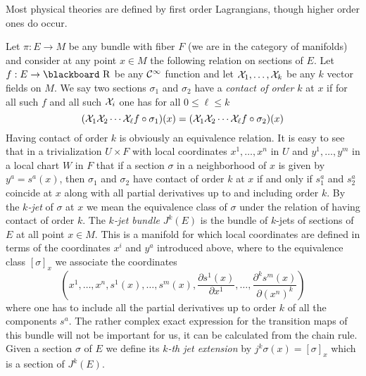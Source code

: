 \documentclass[12pt,titlepage]{article}
\def\bbf#1{\hbox{\blackboard #1}}
\def\lR{\bbf R}
\def\cC{{\cal C}}
\def\cX{{\cal X}}
\begin{document}
 Most physical theories are defined by first order Lagrangians, though
higher order ones do occur.

Let \(\pi:E\to M\) be any bundle with fiber \(F\)
(we are in the category of manifolds) and
consider at any point \(x\in M\) the following relation on
sections of \(E\). Let \(f:E \to \lR\) be any \(\cC^\infty\) function
and let \(\cX_1,\dots,\cX_k\) be any \(k\) vector fields on \(M\). We
say two sections \(\sigma_1\) and \(\sigma_2\) have a {\em contact of
order \(k\)\/}
%
 at \(x\) if for all such \(f\) and all such \(\cX_i\) one
has for all \(0\leq \ell \leq k\)
\[%
(\cX_1\cX_2\cdots\cX_\ell f\circ\sigma_1)(x) = (\cX_1\cX_2\cdots\cX_\ell
f\circ\sigma_2)(x)
\]%
Having contact of order \(k\) is obviously an equivalence relation.
It is easy to see that in a trivialization \(U\times F\) with local
coordinates \(x^1,\dots,x^n\) in \(U\) and \(y^1,\dots,y^m\) in a local
chart \(W\) in \(F\) that if a section \(\sigma\) in a neighborhood
of \(x\) is given by \(y^a = s^a(x)\), then \(\sigma_1\) and
\(\sigma_2\) have contact of order \(k\) at \(x\) if and only if \(s_1^a\) 
and
\(s_2^a\) coincide at \(x\) along with all partial derivatives up to and
including order \(k\). By the {\em \(k\)-jet\/}
%
 of \(\sigma\) at \(x\)
we mean the equivalence class of \(\sigma\) under the relation of having
contact of order \(k\). The {\em \(k\)-jet bundle\/}
%
  \(J^k(E)\) is
the bundle of \(k\)-jets of sections of \(E\) at all point \(x\in M\).
This is a manifold for
which local coordinates are defined in terms of the coordinates \(x^i\)
and \(y^a\) introduced above, where to the equivalence class
\([\sigma]_x\) we associate the coordinates
\[
\left(x^1,\dots,x^n,s^1(x),\dots,s^m(x),\frac{\partial s^1(x)}{\partial
x^1},\dots,\frac{\partial^k s^m(x)}{\partial (x^n)^k}\right)
\]
where one has to include all the partial derivatives up to order \(k\)
of all the components \(s^a\). The rather complex 
exact expression for the transition
maps of this bundle will not be important for us, it can be calculated
from the chain rule.
Given a section \(\sigma\) of \(E\) we define its {\em \(k\)-th jet
extension\/}
%
 by \(j^k\sigma(x) = [\sigma]_x\) which is a section of
\(J^k(E)\).
\end{document}
